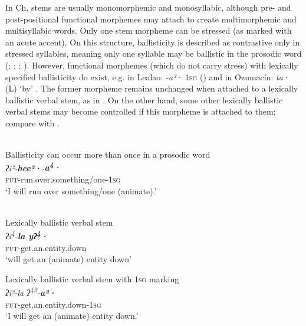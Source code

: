 \documentclass[output=paper]{langscibook}
\begin{document}
In Ch, stems are usually monomorphemic and monosyllabic, although pre- and post-positional functional morphemes may attach to create multimorphemic and multisyllabic words. Only one stem morpheme can be stressed (as marked with an acute accent). On this structure, ballisticity is described as contrastive only in stressed syllables, meaning only one syllable may be ballistic in the prosodic word (\citealt{Merrifield1963}; \citealt{Rensch1968}; \citealt{RuppRupp1996}; \citealt{Silverman2006}). However, functional morphemes (which do not carry stress) with lexically specified ballisticity do exist, e.g. in Lealao: \textit{-a²·} 1\textsc{sg} (\citealt{RuppRupp1996}) and in Ozumacín: \textit{ta}{{·}} (L) ‘by’ \citep{Rupp2012}. The former morpheme remains unchanged when attached to a lexically ballistic verbal stem, as in . On the other hand, some other lexically ballistic verbal stems may become controlled if this morpheme is attached to them; compare  with .

\ea\label{ex:dobui:15}
{\label{bkm:Ref102939767}\citet[10]{Palancar2015}}\\
{Ballisticity can occur more than once in a prosodic word} \\
\gll \textit{ʔi²-\textbf{hee²}\textbf{·}-\textbf{a\textsuperscript{4}}\textbf{·}}\\
     \textsc{fut}-run.over.something/one-1\textsc{sg}\\
\glt ‘I will run over something/one (animate).’
\z

\ea\label{ex:dobui:16}

{\label{bkm:Ref102939769}\citet[3]{Palancar2015}}\\
\ea\label{ex:dobui:16a}
{\label{bkm:Ref102939772}Lexically ballistic verbal stem}\\
     \textit{ʔi\textsuperscript{4}}\textit{-}\textbf{\textit{la yʔ}}\textbf{\textit{\textsuperscript{4}}}\textbf{\textit{·} }\\
\glt \textsc{fut}-get.an.entity.down \\
‘will get an (animate) entity down’

\ex\label{ex:dobui:16b}
{\label{bkm:Ref102939779}Lexically ballistic verbal stem with \textsc{1sg} marking}\\
     \textit{ʔi²}\textit{-la ʔ}\textit{\textsuperscript{42}}\textit{-}\textbf{\textit{a}}\textbf{\textit{²}}\textbf{\textit{·}}\\
     \textsc{fut}-get.an.entity.down-1\textsc{sg}\\
\glt ‘I will get an (animate) entity down.’
\z
\z
\end{document}
